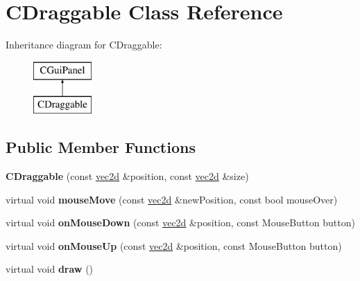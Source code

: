 \hypertarget{class_c_draggable}{
\section{CDraggable Class Reference}
\label{class_c_draggable}
}
Inheritance diagram for CDraggable:\begin{figure}[H]
\begin{center}
\leavevmode
\includegraphics[height=2.000000cm]{class_c_draggable}
\end{center}
\end{figure}
\subsection*{Public Member Functions}
\begin{DoxyCompactItemize}
\item 
\hypertarget{class_c_draggable_aff479e1e062a04dc3cf4707f01df1226}{
{\bfseries CDraggable} (const \hyperlink{classvec2d}{vec2d} \&position, const \hyperlink{classvec2d}{vec2d} \&size)}
\label{class_c_draggable_aff479e1e062a04dc3cf4707f01df1226}

\item 
\hypertarget{class_c_draggable_ad8345786e317adf5100c324bfc9c4642}{
virtual void {\bfseries mouseMove} (const \hyperlink{classvec2d}{vec2d} \&newPosition, const bool mouseOver)}
\label{class_c_draggable_ad8345786e317adf5100c324bfc9c4642}

\item 
\hypertarget{class_c_draggable_a11be111cac73c2118049921ad532a42b}{
virtual void {\bfseries onMouseDown} (const \hyperlink{classvec2d}{vec2d} \&position, const MouseButton button)}
\label{class_c_draggable_a11be111cac73c2118049921ad532a42b}

\item 
\hypertarget{class_c_draggable_aea986fad441b728234d7892307ae9a7a}{
virtual void {\bfseries onMouseUp} (const \hyperlink{classvec2d}{vec2d} \&position, const MouseButton button)}
\label{class_c_draggable_aea986fad441b728234d7892307ae9a7a}

\item 
\hypertarget{class_c_draggable_aaac9d4d4827aea7fb8e63c3f1413a752}{
virtual void {\bfseries draw} ()}
\label{class_c_draggable_aaac9d4d4827aea7fb8e63c3f1413a752}

\end{DoxyCompactItemize}
